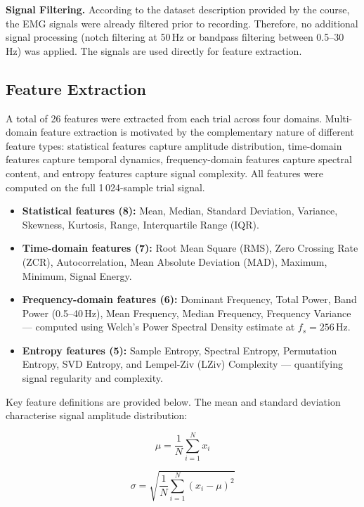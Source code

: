 \textbf{Signal Filtering.}
According to the dataset description provided by the course, the EMG signals were already
filtered prior to recording. Therefore, no additional signal processing (notch filtering at
50\,Hz or bandpass filtering between 0.5--30\,Hz) was applied. The signals are used directly
for feature extraction.

\subsection{Feature Extraction}

A total of 26 features were extracted from each trial across four domains. Multi-domain feature
extraction is motivated by the complementary nature of different feature types: statistical
features capture amplitude distribution, time-domain features capture temporal dynamics,
frequency-domain features capture spectral content, and entropy features capture signal
complexity. All features were computed on the full 1\,024-sample trial signal.

\begin{itemize}
    \item \textbf{Statistical features (8):} Mean, Median, Standard Deviation, Variance,
          Skewness, Kurtosis, Range, Interquartile Range (IQR).
    \item \textbf{Time-domain features (7):} Root Mean Square (RMS), Zero Crossing Rate (ZCR),
          Autocorrelation, Mean Absolute Deviation (MAD), Maximum, Minimum, Signal Energy.
    \item \textbf{Frequency-domain features (6):} Dominant Frequency, Total Power,
          Band Power (0.5--40\,Hz), Mean Frequency, Median Frequency, Frequency Variance ---
          computed using Welch's Power Spectral Density estimate at $f_s = 256$\,Hz.
    \item \textbf{Entropy features (5):} Sample Entropy, Spectral Entropy, Permutation Entropy,
          SVD Entropy, and Lempel-Ziv (LZiv) Complexity --- quantifying signal regularity and
          complexity.
\end{itemize}

Key feature definitions are provided below. The mean and standard deviation characterise signal
amplitude distribution:

\begin{equation}
    \mu = \frac{1}{N} \sum_{i=1}^{N} x_i
    \label{eq:mean}
\end{equation}

\begin{equation}
    \sigma = \sqrt{\frac{1}{N} \sum_{i=1}^{N} \left(x_i - \mu\right)^2}
    \label{eq:std}
\end{equation}

